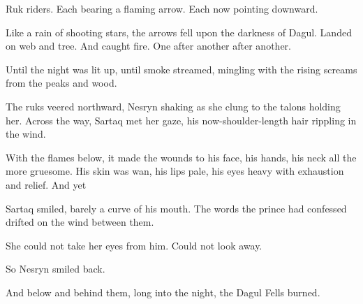 Ruk riders.
Each bearing a flaming arrow.
Each now pointing downward.

Like a rain of shooting stars, the arrows fell upon the darkness of Dagul.
Landed on web and tree.
And caught fire.
One after another after another.

Until the night was lit up, until smoke streamed, mingling with the rising screams from the peaks and wood.

The ruks veered northward, Nesryn shaking as she clung to the talons holding her.
Across the way, Sartaq met her gaze, his now-shoulder-length hair rippling in the wind.

With the flames below, it made the wounds to his face, his hands, his neck all the more gruesome.
His skin was wan, his lips pale, his eyes heavy with exhaustion and relief.
And yet 

Sartaq smiled, barely a curve of his mouth.
The words the prince had confessed drifted on the wind between them.

She could not take her eyes from him.
Could not look away.

So Nesryn smiled back.

And below and behind them, long into the night, the Dagul Fells burned.

